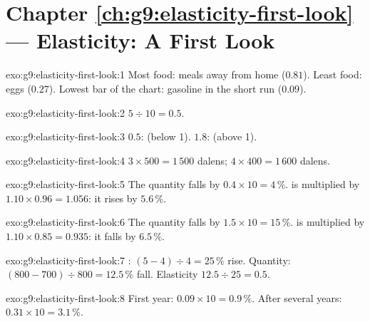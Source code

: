 \section*{Chapter \ref{ch:g9:elasticity-first-look} --- Elasticity: A First Look}

\begin{solution}{exo:g9:elasticity-first-look:1}
Most  food: meals away from home ($0.81$). Least  food: eggs ($0.27$). Lowest bar of the
chart: gasoline in the short run ($0.09$).
\end{solution}

\begin{solution}{exo:g9:elasticity-first-look:2}
$5 \div 10 = 0.5$.
\end{solution}

\begin{solution}{exo:g9:elasticity-first-look:3}
$0.5$:  (below 1). $1.8$:  (above 1).
\end{solution}

\begin{solution}{exo:g9:elasticity-first-look:4}
$3 \times 500 = 1\,500$ dalens; $4 \times 400 = 1\,600$ dalens.
\end{solution}

\begin{solution}{exo:g9:elasticity-first-look:5}
The quantity falls by $0.4 \times 10 = 4\,\%$.  is multiplied by $1.10 \times 0.96 = 1.056$: it
rises by $5.6\,\%$.
\end{solution}

\begin{solution}{exo:g9:elasticity-first-look:6}
The quantity falls by $1.5 \times 10 = 15\,\%$.  is multiplied by $1.10 \times 0.85 = 0.935$: it
falls by $6.5\,\%$.
\end{solution}

\begin{solution}{exo:g9:elasticity-first-look:7}
: $(5 - 4) \div 4 = 25\,\%$ rise. Quantity: $(800 - 700) \div 800 = 12.5\,\%$ fall. Elasticity
$12.5 \div 25 = 0.5$.
\end{solution}

\begin{solution}{exo:g9:elasticity-first-look:8}
First year: $0.09 \times 10 = 0.9\,\%$. After several years: $0.31 \times 10 = 3.1\,\%$.
\end{solution}

